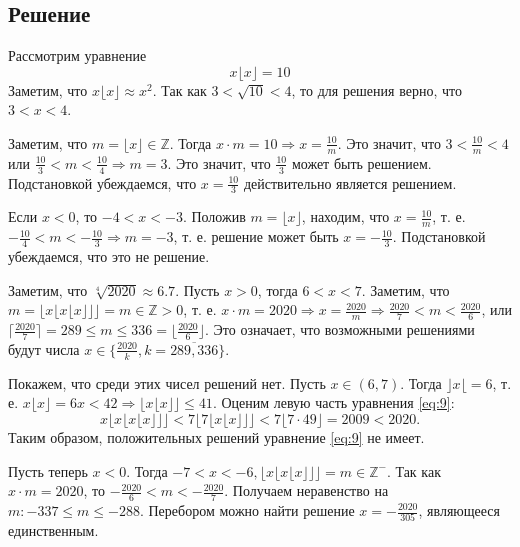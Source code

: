 \documentclass[11pt]{article}
\newcounter{th}\setcounter{th}{0}
\begin{document}
\subsection{Решение}
\label{sec:orge6150f5}
Рассмотрим уравнение
\begin{equation}
x\lfloor x\rfloor = 10
\end{equation}
Заметим, что \(x\lfloor x\rfloor \approx x^2\). Так как \(3 < \sqrt{10} < 4\), то для решения верно, что \(3 < x < 4\).

Заметим, что \(m = \lfloor x\rfloor \in \mathbb{Z}\). Тогда \(x\cdot m = 10 \Rightarrow x = \frac{10}m\). Это значит, что \(3 < \frac{10}m < 4\) или \(\frac{10}3 < m < \frac{10}4 \Rightarrow m = 3\). Это значит, что \(\frac{10}3\) может быть решением. Подстановкой убеждаемся, что \(x = \frac{10}3\) действительно является решением.

Если \(x < 0\), то \(-4 < x < -3\). Положив \(m = \lfloor x\rfloor\), находим, что \(x = \frac{10}m\), т. е. \(-\frac{10}4 < m < -\frac{10}3 \Rightarrow m = -3\), т. е. решение может быть \(x = -\frac{10}3\). Подстановкой убеждаемся, что это не решение.

Заметим, что \(\sqrt[4]{2020} \approx 6.7\). Пусть \(x > 0\), тогда \(6 < x < 7\). Заметим, что \(m = \lfloor x\lfloor x\lfloor x\rfloor\rfloor\rfloor = m \in \mathbb{Z} > 0\), т. е. \(x\cdot m = 2020 \Rightarrow x = \frac{2020}m \Rightarrow \frac{2020}7 < m < \frac{2020}6\), или \(\lceil\frac{2020}7\rceil = 289 \leq m \leq 336 = \lfloor\frac{2020}6\rfloor\). Это означает, что возможными решениями будут числа \(x \in \{\frac{2020}k, k = \overline{289, 336}\}\). 

Покажем, что среди этих чисел решений нет. Пусть \(x \in (6, 7)\). Тогда \(\rfloor x\lfloor = 6\), т. е. \(x\lfloor x\rfloor = 6x < 42 \Rightarrow \lfloor x\lfloor x\rfloor\rfloor \leq 41\). Оценим левую часть уравнения \eqref{eq:9}:
\begin{equation*}
x\lfloor x\lfloor x\lfloor x\rfloor\rfloor\rfloor < 7\lfloor7\lfloor x\lfloor x\rfloor\rfloor\rfloor < 7\lfloor7\cdot49\rfloor = 2009 < 2020.
\end{equation*}
Таким образом, положительных решений уравнение \eqref{eq:9} не имеет.

Пусть теперь \(x < 0\). Тогда \(-7 < x < -6, \lfloor x\lfloor x\lfloor x\rfloor\rfloor\rfloor = m \in \mathbb{Z}^{-}\). Так как \(x\cdot m = 2020\), то \(-\frac{2020}6 < m < -\frac{2020}7\).
Получаем неравенство на \(m: -337 \leq m \leq -288\). Перебором можно найти решение \(x = -\frac{2020}{305}\), являющееся единственным.
\pagebreak
\end{document}

